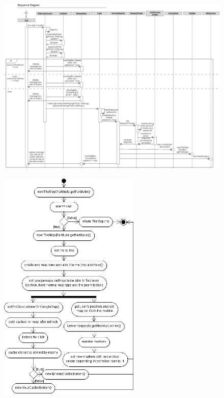 \begin{landscape}
\begin{figure}
    \centering
    \includegraphics[height=\textwidth]{images/sequence/signInbutton}
\end{figure}
\end{landscape}

\begin{figure}
    \includegraphics[width=0.6\textwidth]{images/activity/newMap}
\end{figure}

